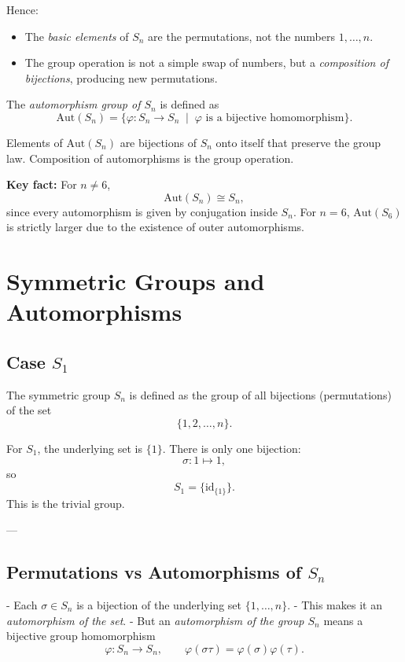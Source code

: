 \documentclass[12pt]{article}
\begin{document}
    \noindent
    Hence:
    \begin{itemize}
    	\item The \emph{basic elements} of $S_n$ are the permutations, not the numbers $1,\dots,n$.  
    	\item The group operation is not a simple swap of numbers, but a \emph{composition of bijections}, producing new permutations.
    \end{itemize}
    
	
	The \emph{automorphism group of $S_n$} is defined as
	$$
	\mathrm{Aut}(S_n) = \{ \varphi : S_n \to S_n \;\mid\; \varphi \text{ is a bijective homomorphism} \}.
	$$
	
	Elements of $\mathrm{Aut}(S_n)$ are bijections of $S_n$ onto itself that preserve the group law.  
	Composition of automorphisms is the group operation.
	
	\medskip
	
	\noindent \textbf{Key fact:} For $n \neq 6$,
	$$
	\mathrm{Aut}(S_n) \cong S_n,
	$$
	since every automorphism is given by conjugation inside $S_n$.  
	For $n=6$, $\mathrm{Aut}(S_6)$ is strictly larger due to the existence of outer automorphisms.
	
	\section*{Symmetric Groups and Automorphisms}
	
	\subsection*{Case $S_1$}
	The symmetric group $S_n$ is defined as the group of all bijections (permutations) of the set
	$$
	\{1,2,\dots,n\}.
	$$
	
	For $S_1$, the underlying set is $\{1\}$.  
	There is only one bijection:
	$$
	\sigma : 1 \mapsto 1,
	$$
	so
	$$
	S_1 = \{\mathrm{id}_{\{1\}}\}.
	$$
	This is the trivial group.
	
	---
	
	\subsection*{Permutations vs Automorphisms of $S_n$}
	- Each $\sigma \in S_n$ is a bijection of the underlying set $\{1,\dots,n\}$.  
	- This makes it an \emph{automorphism of the set}.  
	- But an \emph{automorphism of the group $S_n$} means a bijective group homomorphism
	$$
	\varphi : S_n \to S_n, \qquad \varphi(\sigma\tau) = \varphi(\sigma)\varphi(\tau).
	$$
	
\end{document}

